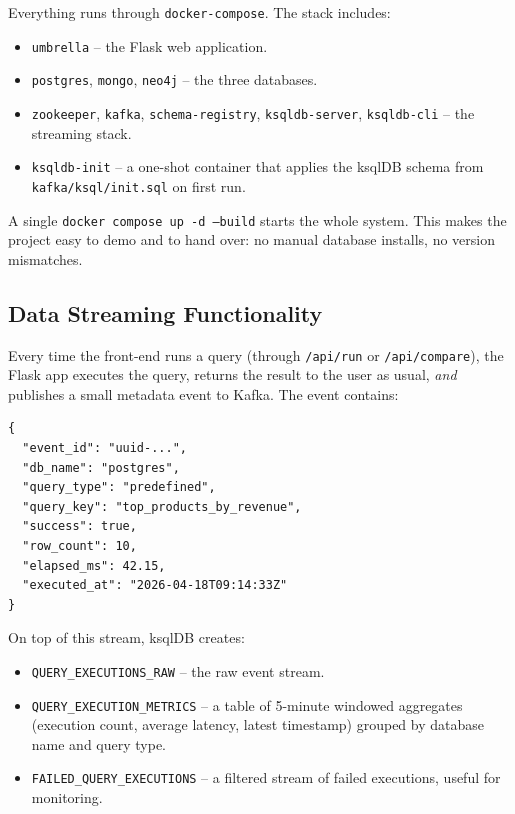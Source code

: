 \documentclass[11pt,a4paper]{article}
\begin{document}
Everything runs through \texttt{docker-compose}. The stack includes:

\begin{itemize}[leftmargin=*]
    \item \texttt{umbrella} -- the Flask web application.
    \item \texttt{postgres}, \texttt{mongo}, \texttt{neo4j} -- the three
          databases.
    \item \texttt{zookeeper}, \texttt{kafka}, \texttt{schema-registry},
          \texttt{ksqldb-server}, \texttt{ksqldb-cli} -- the streaming
          stack.
    \item \texttt{ksqldb-init} -- a one-shot container that applies the
          ksqlDB schema from \texttt{kafka/ksql/init.sql} on first run.
\end{itemize}

A single \texttt{docker compose up -d --build} starts the whole system.
This makes the project easy to demo and to hand over: no manual database
installs, no version mismatches.

\subsection{Data Streaming Functionality}

Every time the front-end runs a query (through \texttt{/api/run} or
\texttt{/api/compare}), the Flask app executes the query, returns the
result to the user as usual, \emph{and} publishes a small metadata event to
Kafka. The event contains:

\begin{lstlisting}[caption={Query execution event (JSON)}]
{
  "event_id": "uuid-...",
  "db_name": "postgres",
  "query_type": "predefined",
  "query_key": "top_products_by_revenue",
  "success": true,
  "row_count": 10,
  "elapsed_ms": 42.15,
  "executed_at": "2026-04-18T09:14:33Z"
}
\end{lstlisting}

On top of this stream, ksqlDB creates:

\begin{itemize}[leftmargin=*]
    \item \texttt{QUERY\_EXECUTIONS\_RAW} -- the raw event stream.
    \item \texttt{QUERY\_EXECUTION\_METRICS} -- a table of 5-minute windowed
          aggregates (execution count, average latency, latest timestamp)
          grouped by database name and query type.
    \item \texttt{FAILED\_QUERY\_EXECUTIONS} -- a filtered stream of failed
          executions, useful for monitoring.
\end{itemize}
\end{document}
